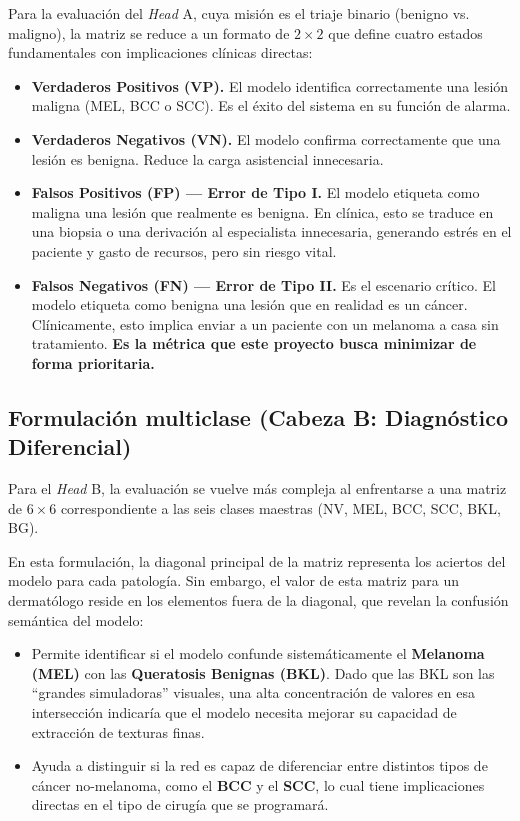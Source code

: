 Para la evaluación del \textit{Head} A, cuya misión es el triaje binario (benigno vs. maligno), la matriz se reduce a un formato de $2 \times 2$ que define cuatro estados fundamentales con implicaciones clínicas directas:

\begin{itemize}
	\item \textbf{Verdaderos Positivos (VP).} El modelo identifica correctamente una lesión maligna (MEL, BCC o SCC). Es el éxito del sistema en su función de alarma.
	
	\item \textbf{Verdaderos Negativos (VN).} El modelo confirma correctamente que una lesión es benigna. Reduce la carga asistencial innecesaria.
	
	\item \textbf{Falsos Positivos (FP) --- Error de Tipo I.} El modelo etiqueta como maligna una lesión que realmente es benigna. En clínica, esto se traduce en una biopsia o una derivación al especialista innecesaria, generando estrés en el paciente y gasto de recursos, pero sin riesgo vital.
	
	\item \textbf{Falsos Negativos (FN) --- Error de Tipo II.} Es el escenario crítico. El modelo etiqueta como benigna una lesión que en realidad es un cáncer. Clínicamente, esto implica enviar a un paciente con un melanoma a casa sin tratamiento. \textbf{Es la métrica que este proyecto busca minimizar de forma prioritaria.}
\end{itemize}

\subsection{Formulación multiclase (Cabeza B: Diagnóstico Diferencial)}

Para el \textit{Head} B, la evaluación se vuelve más compleja al enfrentarse a una matriz de $6 \times 6$ correspondiente a las seis clases maestras (NV, MEL, BCC, SCC, BKL, BG).

En esta formulación, la diagonal principal de la matriz representa los aciertos del modelo para cada patología. Sin embargo, el valor de esta matriz para un dermatólogo reside en los elementos fuera de la diagonal, que revelan la confusión semántica del modelo:

\begin{itemize}
	\item Permite identificar si el modelo confunde sistemáticamente el \textbf{Melanoma (MEL)} con las \textbf{Queratosis Benignas (BKL)}. Dado que las BKL son las ``grandes simuladoras'' visuales, una alta concentración de valores en esa intersección indicaría que el modelo necesita mejorar su capacidad de extracción de texturas finas.
	
	\item Ayuda a distinguir si la red es capaz de diferenciar entre distintos tipos de cáncer no-melanoma, como el \textbf{BCC} y el \textbf{SCC}, lo cual tiene implicaciones directas en el tipo de cirugía que se programará.
\end{itemize}

